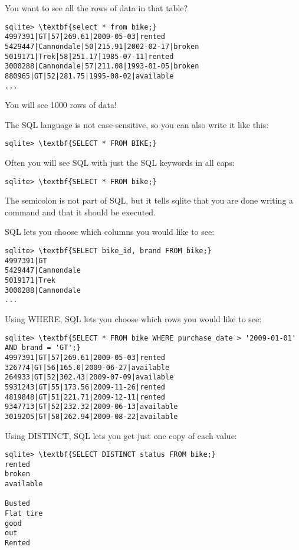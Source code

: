 You want to see all the rows of data in that table?

\begin{Verbatim}[commandchars=\\\{\}]
sqlite> \textbf{select * from bike;}
4997391|GT|57|269.61|2009-05-03|rented
5429447|Cannondale|50|215.91|2002-02-17|broken
5019171|Trek|58|251.17|1985-07-11|rented
3000288|Cannondale|57|211.08|1993-01-05|broken
880965|GT|52|281.75|1995-08-02|available
...
\end{Verbatim}

You will see 1000 rows of data!

The SQL language is not case-sensitive, so you can also write it like this:
\begin{Verbatim}[commandchars=\\\{\}]
sqlite> \textbf{SELECT * FROM BIKE;}    
\end{Verbatim}

Often you will see SQL with just the SQL keywords in all caps:
\begin{Verbatim}[commandchars=\\\{\}]
sqlite> \textbf{SELECT * FROM bike;}    
\end{Verbatim}
The semicolon is not part of SQL, but it tells sqlite that you are done writing a command and that it should be executed.

SQL lets you choose which columns you would like to see:
\begin{Verbatim}[commandchars=\\\{\}]
sqlite> \textbf{SELECT bike_id, brand FROM bike;}
4997391|GT
5429447|Cannondale
5019171|Trek
3000288|Cannondale
...
\end{Verbatim}

Using WHERE, SQL lets you choose which rows you would like to see:
\begin{Verbatim}[commandchars=\\\{\}]
sqlite> \textbf{SELECT * FROM bike WHERE purchase_date > '2009-01-01' AND brand = 'GT';}
4997391|GT|57|269.61|2009-05-03|rented
326774|GT|56|165.0|2009-06-27|available
264933|GT|52|302.43|2009-07-09|available
5931243|GT|55|173.56|2009-11-26|rented
4819848|GT|51|221.71|2009-12-11|rented
9347713|GT|52|232.32|2009-06-13|available
3019205|GT|58|262.94|2009-08-22|available    
\end{Verbatim}

Using DISTINCT, SQL lets you get just one copy of each value:
\begin{Verbatim}[commandchars=\\\{\}]
sqlite> \textbf{SELECT DISTINCT status FROM bike;}
rented
broken
available

Busted
Flat tire
good
out
Rented
\end{Verbatim}

